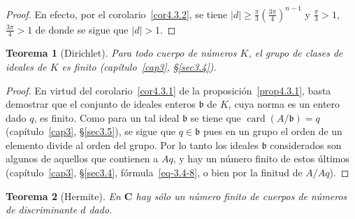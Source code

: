 \documentclass[10pt,oneside,bibtotoc,smallheadings,leqno,a5paper,DIV=12]{scrbook}
\newcommand{\CC}{\mathbf{C}}
\newcommand{\idl}[1]{\mathfrak{#1}}
\newcommand{\QED}{}%
\newcommand{\abs}[1]{\left\lvert#1\right\rvert}
\DeclareMathOperator{\card}{card}
\numberwithin{equation}{section}
\theoremstyle{defi}
\theoremstyle{enonce}
\newtheorem{theorem}{Teorema}
\theoremstyle{rem}
\numberwithin{theorem}{section}
\numberwithin{proposition}{section}
\numberwithin{definition}{section}
\numberwithin{lemma}{section}
\numberwithin{corollary}{section}
\numberwithin{example}{section}
\numberwithin{footnote}{section}%
\begin{document}
\begin{proof}
En efecto, por el corolario~\ref{cor4.3.2}, se tiene $\abs{d}\geq\frac{\pi}{3}\left(\frac{3\pi}{4}\right)^{n-1}$ y
$\frac{\pi}{3} >1$, $\frac{3\pi}{4} > 1$ de donde se sigue que $\abs{d} > 1$.
\end{proof}

\begin{theorem}[Dirichlet]\label{teo4.3.2}
Para todo cuerpo de n\'umeros $K$, el grupo de clases de ideales de $K$ es finito (cap\'itulo~\ref{cap3}, \S\ref{sec3.4}).
\end{theorem}

\begin{proof}
En virtud del corolario~\ref{cor4.3.1} de la proposici\'on~\ref{prop4.3.1},
basta demostrar que el conjunto de ideales enteros $\idl{b}$
de $K$, cuya norma es un entero dado $q$, es finito. Como para un tal ideal $\idl{b}$ se tiene que
$\card(A/\idl{b}) = q$ (cap\'itulo~\ref{cap3}, \S\ref{sec3.5}), se sigue que $q\in\idl{b}$ pues en un grupo el orden de un elemento
divide al orden del grupo. Por lo tanto los ideales $\idl{b}$ considerados son algunos de aquellos que contienen
a $Aq$, y hay un n\'umero finito de estos \'ultimos (cap\'itulo~\ref{cap3}, \S\ref{sec3.4}, f\'ormula~\eqref{eq-3.4-8},
o bien por la finitud de
$A/Aq$).%
\end{proof}

\begin{theorem}[Hermite]\label{teo4.3.3}
En $\CC$ hay s\'olo un n\'umero finito de cuerpos de n\'umeros de discriminante $d$ dado.
\end{theorem}
\end{document}
